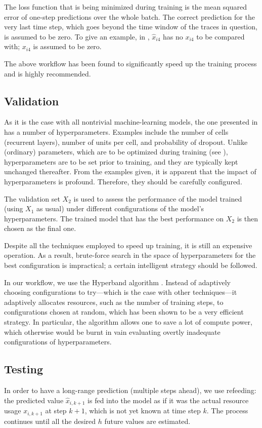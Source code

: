 The loss function that is being minimized during training is the mean squared
error of one-step predictions over the whole batch. The correct prediction for
the very last time step, which goes beyond the time window of the traces in
question, is assumed to be zero. To give an example, in ,
$\hat{x}_{i4}$ has no $x_{i4}$ to be compared with; $x_{i4}$ is assumed to be
zero.

The above workflow has been found to significantly speed up the training
process and is highly recommended.

\subsection{Validation}
As it is the case with all nontrivial machine-learning models, the one presented
in  has a number of hyperparameters. Examples include the number of
cells (recurrent layers), number of units per cell, and probability of dropout.
Unlike (ordinary) parameters, which are to be optimized during training (see
), hyperparameters are to be set prior to training, and they are
typically kept unchanged thereafter. From the examples given, it is apparent
that the impact of hyperparameters is profound. Therefore, they should be
carefully configured.

The validation set $X_2$ is used to assess the performance of the model trained
(using $X_1$ as usual) under different configurations of the model's
hyperparameters. The trained model that has the best performance on $X_2$ is
then chosen as the final one.

Despite all the techniques employed to speed up training, it is still an
expensive operation. As a result, brute-force search in the space of
hyperparameters for the best configuration is impractical; a certain intelligent
strategy should be followed.

In our workflow, we use the Hyperband algorithm \cite{li2016}. Instead of
adaptively choosing configurations to try---which is the case with other
techniques---it adaptively allocates resources, such as the number of training
steps, to configurations chosen at random, which has been shown to be a very
efficient strategy. In particular, the algorithm allows one to save a lot of
compute power, which otherwise would be burnt in vain evaluating overtly
inadequate configurations of hyperparameters.

\subsection{Testing}
In order to have a long-range prediction (multiple steps ahead), we use
refeeding: the predicted value $\hat{x}_{i,k + 1}$ is fed into the model as if
it was the actual resource usage $x_{i,k + 1}$ at step $k + 1$, which is not
yet known at time step $k$. The process continues until all the desired $h$
future values are estimated.
